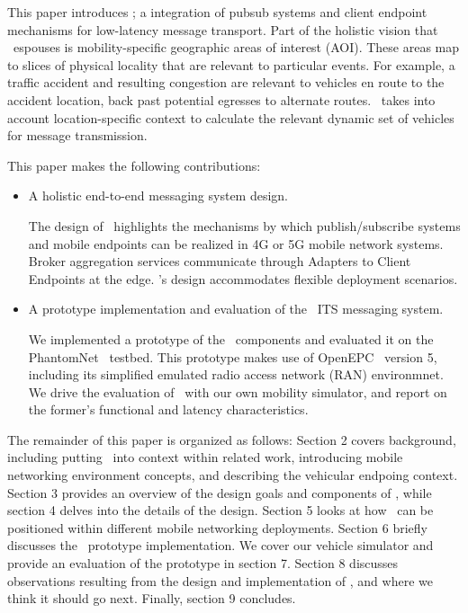 This paper introduces \name; a integration of pubsub systems and
client endpoint mechanisms for low-latency message transport.  Part of
the holistic vision that \name~espouses is mobility-specific
geographic areas of interest (AOI). These areas map to slices of
physical locality that are relevant to particular events.  For
example, a traffic accident and resulting congestion are relevant to
vehicles en route to the accident location, back past potential
egresses to alternate routes.  \name~takes into account
location-specific context to calculate the relevant dynamic set of
vehicles for message transmission.

This paper makes the following contributions:
\begin{itemize}

\item A holistic end-to-end messaging system design.

The design of \name~highlights the mechanisms by which
publish/subscribe systems and mobile endpoints can be realized in 4G
or 5G mobile network systems. Broker aggregation services communicate
through Adapters to Client Endpoints at the edge. \name's design
accommodates flexible deployment scenarios.

\item A prototype implementation and evaluation of the \name~ITS
  messaging system.

We implemented a prototype of the \name~components and evaluated it
on the PhantomNet~\cite{banerjee2015phantomnet} testbed.  This
prototype makes use of OpenEPC~\cite{corici2010openepc} version 5,
including its simplified emulated radio access network (RAN)
environmnet. We drive the evaluation of \name~with our own mobility
simulator, and report on the former's functional and latency
characteristics.

\end{itemize}

The remainder of this paper is organized as follows: Section 2 covers
background, including putting \name~into context within related
work, introducing mobile networking environment concepts, and
describing the vehicular endpoing context. Section 3 provides an
overview of the design goals and components of \name, while section
4 delves into the details of the design. Section 5 looks at how
\name~can be positioned within different mobile networking
deployments.  Section 6 briefly discusses the \name~prototype
implementation. We cover our vehicle simulator and provide an
evaluation of the prototype in section 7. Section 8 discusses
observations resulting from the design and implementation of \name,
and where we think it should go next.  Finally, section 9 concludes.
